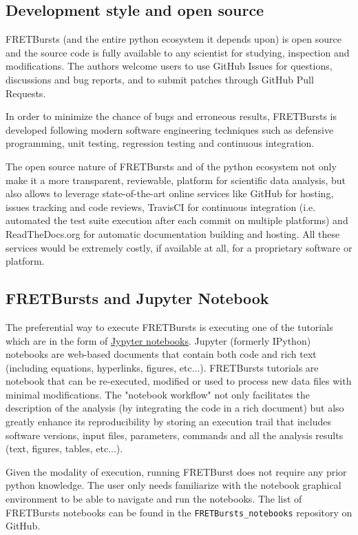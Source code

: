 \subsection{Development style and open source}

FRETBursts (and the entire python ecosystem it depends upon) is open source 
and the source code is fully available to any scientist for studying, 
inspection and modifications.
The authors welcome users to use GitHub Issues for questions, discussions
and bug reports, and to submit patches through GitHub Pull Requests.

In order to minimize the chance of bugs and erroneous results, FRETBursts is developed
following modern software engineering techniques such 
as defensive programming, unit testing, regression testing and continuous integration.

The open source nature of FRETBursts and of the python ecosystem 
not only make it a more transparent, reviewable, platform 
for scientific data analysis, but also allows 
to leverage state-of-the-art online services like GitHub for hosting, issues tracking and code 
reviews, TravisCI for continuous integration (i.e. automated the test suite execution after 
each commit on multiple platforms) 
and ReadTheDocs.org for automatic documentation building and hosting. 
All these services would be extremely costly, if available at all, 
for a proprietary software or platform.

\subsection{FRETBursts and Jupyter Notebook}

The preferential way to execute FRETBursts is executing one of the tutorials 
which are in the form of \href{http://ipython.org/notebook.html}{Jypyter notebooks}.
Jupyter (formerly IPython) notebooks are web-based documents that contain both 
code and rich text (including equations, hyperlinks, figures, etc...).
FRETBursts tutorials are notebook that can be re-executed,
modified or used to process new data files with minimal modifications.
The "notebook workflow"\cite{Shen_2014} not only facilitates 
the description of the analysis (by integrating the code in a rich document)
but also greatly enhance its reproducibility by storing an execution trail
that includes software versions, input files, parameters, commands and all
the analysis results (text, figures, tables, etc...).

Given the modality of execution, running FRETBurst does not require
any prior python knowledge. The user only needs familiarize with the
notebook graphical environment to be able to navigate and run the notebooks.
The list of FRETBursts notebooks can be found in the 
\verb|FRETBursts_notebooks| repository on GitHub.


